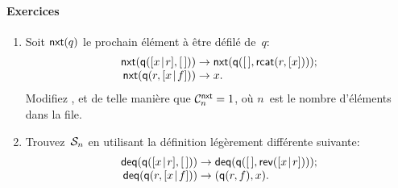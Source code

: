 \paragraph{Exercices}
\begin{enumerate}

  \item Soit \(\fun{nxt}(q)\) le prochain
    élément à être défilé de~\(q\):
    \begin{equation*}
      \begin{array}{r@{\;}l@{\;}l}
        \fun{nxt}(\fun{q}(\cons{x}{r},\el)) & \rightarrow
        & \fun{nxt}(\fun{q}(\el,\fun{rcat}(r,[x])));\\
        \fun{nxt}(\fun{q}(r,\cons{x}{f})) & \rightarrow & x.
        \index{q@\fun{q/2}}
      \end{array}
    \end{equation*}
    Modifiez ,
     et
     de telle manière que
    \(\C{\fun{nxt}}{n} = 1\), où
    \(n\)~est le nombre d'éléments dans la file.

    \item Trouvez~\(\A{n}\) en utilisant la définition légèrement
      différente suivante:
      \begin{equation*}
        \begin{array}{@{}r@{\;}l@{\;}l@{}}
          \fun{deq}(\fun{q}(\cons{x}{r},\el))
          & \rightarrow
          & \fun{deq}(\fun{q}(\el,\fun{rev}(\cons{x}{r})));\\
          \fun{deq}(\fun{q}(r,\cons{x}{f}))
          & \rightarrow
          & \pair{\fun{q}(r,f)}{x}.
        \end{array}
      \end{equation*}

\end{enumerate}
